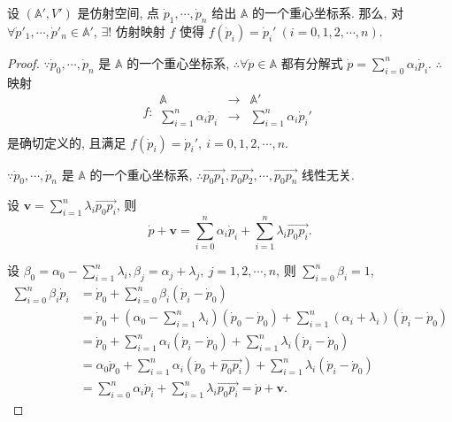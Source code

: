 \documentclass[color=black,device=normal,lang=cn,mode=geye]{elegantnote}
\begin{document}
\begin{theorem}[书上的命题 2 (ii)]\label{t1.7}
    设 $(\mathbb{A}',V')$ 是仿射空间, 点 $\dot{p}_1,\cdots,\dot{p}_n$ 给出 $\mathbb{A}$ 的一个重心坐标系. 那么, 对 $\forall\dot{p}'_1,\cdots,\dot{p}'_n\in\mathbb{A}'$, $\exists!$ 仿射映射 $f$ 使得 $f(\dot{p}_i)=\dot{p}_i'\ (i=0,1,2,\cdots,n)$.
\end{theorem}
\begin{proof}
    $\because\dot{p}_0,\cdots,\dot{p}_n$ 是 $\mathbb{A}$ 的一个重心坐标系, $\therefore\forall\dot{p}\in\mathbb{A}$ 都有分解式 $\dot{p}=\sum\limits_{i=0}^n\alpha_i\dot{p}_i$. $\therefore$ 映射
    \[f:\begin{array}{rcl}
        \mathbb{A} & \to & \mathbb{A}' \\
        \sum\limits_{i=1}^n\alpha_i\dot{p}_i & \to & \sum\limits_{i=1}^n\alpha_i\dot{p}_i' \\
    \end{array}\]
    是确切定义的, 且满足 $f(\dot{p}_i)=\dot{p}_i',\ i=0,1,2,\cdots,n$.
    
    $\because\dot{p}_0,\cdots,\dot{p}_n$ 是 $\mathbb{A}$ 的一个重心坐标系, $\therefore\overrightarrow{p_0p_1},\overrightarrow{p_0p_2},\cdots,\overrightarrow{p_0p_n}$ 线性无关.
    
    设 $\boldsymbol{v}=\sum\limits_{i=1}^n\lambda_i\overrightarrow{p_0p_i}$, 则
    \[\dot{p}+\boldsymbol{v}=\sum\limits_{i=0}^n\alpha_i\dot{p}_i+\sum\limits_{i=1}^n\lambda_i\overrightarrow{p_0p_i}.\]

    设 $\beta_0=\alpha_0-\sum\limits_{i=1}^n\lambda_i,\beta_j=\alpha_j+\lambda_j,\ j=1,2,\cdots,n$, 则 $\sum\limits_{i=0}^n\beta_i=1$,
    \begin{align*}
        \sum\limits_{i=0}^n\beta_i\dot{p}_i & =\dot{p}_0+\sum\limits_{i=0}^n\beta_i(\dot{p}_i-\dot{p}_0) \\
        & =\dot{p}_0+\left(\alpha_0-\sum\limits_{i=1}^n\lambda_i\right)(\dot{p}_0-\dot{p}_0)+\sum\limits_{i=1}^n(\alpha_i+\lambda_i)(\dot{p}_i-\dot{p}_0) \\
        & =\dot{p}_0+\sum\limits_{i=1}^n\alpha_i(\dot{p}_i-\dot{p}_0)+\sum\limits_{i=1}^n\lambda_i(\dot{p}_i-\dot{p}_0) \\
        & =\alpha_0\dot{p}_0+\sum\limits_{i=1}^n\alpha_i(\dot{p}_0+\overrightarrow{p_0p_i})+\sum\limits_{i=1}^n\lambda_i(\dot{p}_i-\dot{p}_0) \\
        & =\sum\limits_{i=0}^n\alpha_i\dot{p}_i+\sum\limits_{i=1}^n\lambda_i\overrightarrow{p_0p_i}=\dot{p}+\boldsymbol{v}.
    \end{align*}


\end{proof}
\end{document}
